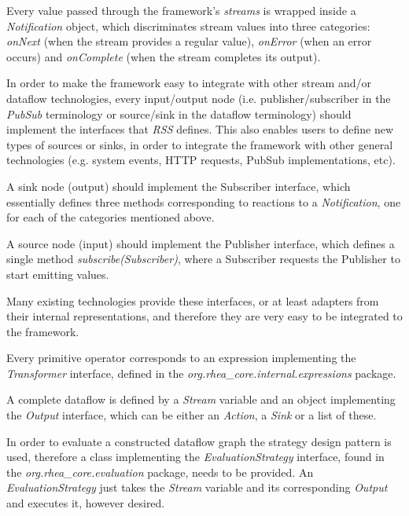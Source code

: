 \documentclass{dithesis}
\begin{document}

Every value passed through the framework's \textit{streams} is wrapped inside a \textit{Notification} object, which discriminates stream values into three categories: \textit{onNext} (when the stream provides a regular value), \textit{onError} (when an error occurs) and \textit{onComplete} (when the stream completes its output).

In order to make the framework easy to integrate with other stream and/or dataflow technologies, every input/output node (i.e. publisher/subscriber in the \textit{PubSub} terminology or source/sink in the dataflow terminology) should implement the interfaces that \textit{RSS} defines. This also enables users to define new types of sources or sinks, in order to integrate the framework with other general technologies (e.g. system events, HTTP requests, PubSub implementations, etc).

A sink node (output) should implement the Subscriber interface, which essentially defines three methods corresponding to reactions to a \textit{Notification}, one for each of the categories mentioned above. 

A source node (input) should implement the Publisher interface, which defines a single method \textit{subscribe(Subscriber)}, where a Subscriber requests the Publisher to start emitting values. 

Many existing technologies provide these interfaces, or at least adapters from their internal representations, and therefore they are very easy to be integrated to the framework.


Every primitive operator corresponds to an expression implementing the \textit{Transformer} interface, defined in the \textit{org.rhea\_core.internal.expressions} package. 

A complete dataflow is defined by a \textit{Stream} variable and an object implementing the \textit{Output} interface, which can be either an \textit{Action}, a \textit{Sink} or a list of these. 

In order to evaluate a constructed dataflow graph the strategy design pattern is used, therefore a class implementing the \textit{EvaluationStrategy} interface, found in the \textit{org.rhea\_core.evaluation} package, needs to be provided. An \textit{EvaluationStrategy} just takes the \textit{Stream} variable and its corresponding \textit{Output} and executes it, however desired.
\end{document}

